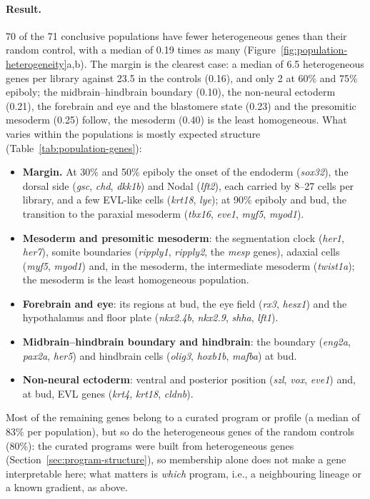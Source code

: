 \documentclass[11pt,a4paper]{article}
\begin{document}
\paragraph{Result.} 70 of the 71 conclusive populations have fewer heterogeneous genes than their random control, with a median of 0.19 times as many (Figure~\ref{fig:population-heterogeneity}a,b). The margin is the clearest case: a median of 6.5 heterogeneous genes per library against 23.5 in the controls (0.16), and only 2 at 60\% and 75\% epiboly; the midbrain--hindbrain boundary (0.10), the non-neural ectoderm (0.21), the forebrain and eye and the blastomere state (0.23) and the presomitic mesoderm (0.25) follow, the mesoderm (0.40) is the least homogeneous. What varies within the populations is mostly expected structure (Table~\ref{tab:population-genes}):
\begin{itemize}
	\item \textbf{Margin.} At 30\% and 50\% epiboly the onset of the endoderm (\emph{sox32}), the dorsal side (\emph{gsc}, \emph{chd}, \emph{dkk1b}) and Nodal (\emph{lft2}), each carried by 8--27 cells per library, and a few EVL-like cells (\emph{krt18}, \emph{lye}); at 90\% epiboly and bud, the transition to the paraxial mesoderm (\emph{tbx16}, \emph{eve1}, \emph{myf5}, \emph{myod1}).
	\item \textbf{Mesoderm and presomitic mesoderm}: the segmentation clock (\emph{her1}, \emph{her7}), somite boundaries (\emph{ripply1}, \emph{ripply2}, the \emph{mesp} genes), adaxial cells (\emph{myf5}, \emph{myod1}) and, in the mesoderm, the intermediate mesoderm (\emph{twist1a}); the mesoderm is the least homogeneous population.
	\item \textbf{Forebrain and eye}: its regions at bud, the eye field (\emph{rx3}, \emph{hesx1}) and the hypothalamus and floor plate (\emph{nkx2.4b}, \emph{nkx2.9}, \emph{shha}, \emph{lft1}).
	\item \textbf{Midbrain--hindbrain boundary and hindbrain}: the boundary (\emph{eng2a}, \emph{pax2a}, \emph{her5}) and hindbrain cells (\emph{olig3}, \emph{hoxb1b}, \emph{mafba}) at bud.
	\item \textbf{Non-neural ectoderm}: ventral and posterior position (\emph{szl}, \emph{vox}, \emph{eve1}) and, at bud, EVL genes (\emph{krt4}, \emph{krt18}, \emph{cldnb}).
\end{itemize}
Most of the remaining genes belong to a curated program or profile (a median of 83\% per population), but so do the heterogeneous genes of the random controls (80\%): the curated programs were built from heterogeneous genes (Section~\ref{sec:program-structure}), so membership alone does not make a gene interpretable here; what matters is \emph{which} program, i.e., a neighbouring lineage or a known gradient, as above.
\end{document}
